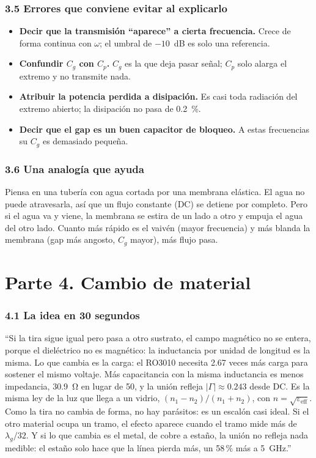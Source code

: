 \documentclass[11pt,letterpaper]{article}
\begin{document}
\section*{3.5 Errores que conviene evitar al explicarlo}
\begin{itemize}
\item \textbf{Decir que la transmisión ``aparece'' a cierta frecuencia.} Crece de forma continua con $\omega$; el umbral de $-10$~dB es solo una referencia.
\item \textbf{Confundir $C_g$ con $C_p$.} $C_g$ es la que deja pasar señal; $C_p$ solo alarga el extremo y no transmite nada.
\item \textbf{Atribuir la potencia perdida a disipación.} Es casi toda radiación del extremo abierto; la disipación no pasa de \SI{0.2}{\percent}.
\item \textbf{Decir que el gap es un buen capacitor de bloqueo.} A estas frecuencias su $C_g$ es demasiado pequeña.
\end{itemize}

\section*{3.6 Una analogía que ayuda}
Piensa en una tubería con agua cortada por una membrana elástica. El agua no puede atravesarla, así que un flujo constante (DC) se detiene por completo. Pero si el agua va y viene, la membrana se estira de un lado a otro y empuja el agua del otro lado. Cuanto más rápido es el vaivén (mayor frecuencia) y más blanda la membrana (gap más angosto, $C_g$ mayor), más flujo pasa.

\part*{Parte 4. Cambio de material}

\section*{4.1 La idea en 30 segundos}
\begin{idea}
``Si la tira sigue igual pero pasa a otro sustrato, el campo magnético no se entera, porque el dieléctrico no es magnético: la inductancia por unidad de longitud es la misma. Lo que cambia es la carga: el RO3010 necesita 2.67 veces más carga para sostener el mismo voltaje. Más capacitancia con la misma inductancia es menos impedancia, \SI{30.9}{\ohm} en lugar de 50, y la unión refleja $|\Gamma|\approx0.243$ desde DC. Es la misma ley de la luz que llega a un vidrio, $(n_1-n_2)/(n_1+n_2)$, con $n=\sqrt{\varepsilon_{\mathrm{eff}}}$. Como la tira no cambia de forma, no hay parásitos: es un escalón casi ideal. Si el otro material ocupa un tramo, el efecto aparece cuando el tramo mide más de $\lambda_g/32$. Y si lo que cambia es el metal, de cobre a estaño, la unión no refleja nada medible: el estaño solo hace que la línea pierda más, un 58\,\% más a \SI{5}{GHz}.''
\end{idea}
\end{document}
